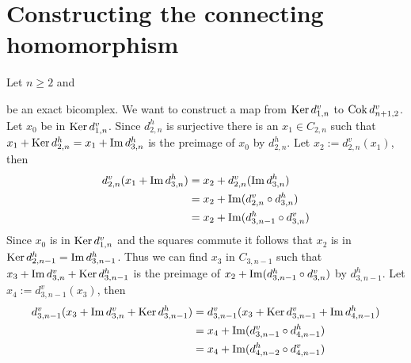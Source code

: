 
\section{Constructing the connecting homomorphism}
Let $n \geq 2$ and
\begin{center}
\end{center}
be an exact bicomplex. We want to construct a map from $\operatorname{Ker} d^v_{1, n}$ to $\operatorname{Cok} d^v_{n+1,2}$. Let $x_0$ be in $\operatorname{Ker} d^v_{1, n}$. Since $d^h_{2,n}$ is surjective there is an $x_1 \in C_{2,n}$ such that $x_1 + \operatorname{Ker} d^h_{2,n} = x_1 + \operatorname{Im} d^h_{3, n}$ is the preimage of $x_0$ by $d^h_{2,n}$. Let $x_2 := d^v_{2,n}(x_1)$, then
\begin{align*}
    d^v_{2,n}(x_1 + \operatorname{Im} d^h_{3, n}) &= x_2 + d^v_{2,n}(\operatorname{Im} d^h_{3, n})\\ 
    &= x_2 + \operatorname{Im} (d^v_{2,n} \circ d^h_{3, n})\\
    &= x_2 + \operatorname{Im} (d^h_{3, n-1} \circ d^v_{3, n})
\end{align*}
Since $x_0$ is in $\operatorname{Ker} d^v_{1, n}$ and the squares commute it follows that $x_2$ is in $\operatorname{Ker} d^h_{2,n-1} = \operatorname{Im} d^h_{3, n-1}$. Thus we can find $x_3$ in $C_{3, n-1}$ such that $x_3 +  \operatorname{Im} d^v_{3, n} + \operatorname{Ker} d^h_{3, n-1}$ is the preimage of $x_2 + \operatorname{Im} (d^h_{3, n-1} \circ d^v_{3, n})$ by $d^h_{3, n-1}$. Let $x_4 := d^v_{3,n-1} (x_3)$, then
\begin{align*}
    d^v_{3,n-1} (x_3 +  \operatorname{Im} d^v_{3, n} + \operatorname{Ker} d^h_{3, n-1}) 
    &= d^v_{3,n-1} (x_3 +  \operatorname{Ker} d^v_{3, n-1} + \operatorname{Im} d^h_{4, n-1}) \\
    &= x_4 + \operatorname{Im} (d^v_{3,n-1} \circ d^h_{4, n-1}) \\ 
    &=
    x_4 + \operatorname{Im} (d^h_{4, n-2} \circ d^v_{4, n-1})
\end{align*}
